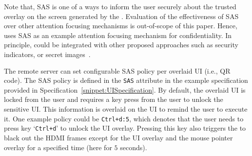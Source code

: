 Note that, SAS is one of a ways to inform the user securely about the trusted overlay on the screen generated by the \device. Evaluation of the effectiveness of SAS over other attention focusing mechanisms is out-of-scope of this paper. Hence, \name uses SAS as an example attention focusing mechanism for confidentiality. In principle, \name could be integrated with other proposed approaches such as security indicators, or secret images~\cite{6894474,Marforio2016}.

 The remote server can set configurable SAS policy per overlaid UI (i.e., QR code). The SAS policy is defined in the \texttt{SAS} attribute in the example specification provided in Specification~\ref{snippet:UISpecification}. By default, the overlaid UI is locked from the user and requires a key press from the user to unlock the sensitive UI. This information is overlaid on the UI to remind the user to execute it. One example policy could be \texttt{Ctrl+d:5}, which denotes that the user needs to press key `\texttt{Ctrl+d}' to unlock the UI overlay. Pressing this key also triggers the \device to black out the HDMI frames except for the UI overlay and the mouse pointer overlay for a specified time (here for $5$ seconds). 


